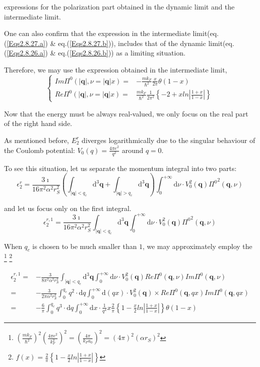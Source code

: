 expressions for the polarization part obtained in the dynamic limit and the intermediate limit.

One can also confirm that the expression in the intermediate limit(eq.(\ref{Eqs2.8.27.a}) \& eq.(\ref{Eqs2.8.27.b})), includes that of the dynamic limit(eq.(\ref{Eqs2.8.26.a}) \& eq.(\ref{Eqs2.8.26.b})) as a limiting situation.

Therefore, we may use the expression obtained in the intermediate limit,
\[\left\{ \begin{split}
Im \Pi^0(|\mathbf{q}|, \nu = |\mathbf{q}| x) =& - \frac{m k_F}{\hbar^2} \frac{x}{2\pi} \theta(1-x)\\
Re \Pi^0(|\mathbf{q}|, \nu = |\mathbf{q}| x) =& \frac{m k_F}{\hbar^2}\frac{1}{2\pi^2}\left\{ -2 + x ln\left| \frac{1+x}{1-x} \right| \right\}
\end{split} \right.\]

Now that the energy must be always real-valued, we only focus on the real part of the right hand side.

As mentioned before, $E_2^r$ diverges logarithmically due to the singular behaviour of the Coulomb potential: $V_0(q) = \frac{4\pi e^2}{q^2}$ around $q=0$.

To see this situation, let us separate the momentum integral into two parts:
\[ \epsilon_2^r = \frac{3\imath}{16\pi^2 \alpha^2 r_S^2} \left( \int_{|\mathbf{q}|<q_c} \mathrm{d}^3 \mathbf{q} + \int_{|\mathbf{q}|>q_c} \mathrm{d}^3 \mathbf{q} \right) \int_0^{+\infty} \mathrm{d} \nu \cdot V_0^2(\mathbf{q}) {\Pi^0}^2(\mathbf{q},\nu) \]

and let us focus only on the first integral.
\begin{equation*} \label{Eqs2.8.9.c} \tag{2.8.9.c}
\epsilon_2^{r,1} = \frac{3\imath}{16\pi^2 \alpha^2 r_S^2} \int_{|\mathbf{q}|<q_c} \mathrm{d}^3 \mathbf{q} \int_0^{+\infty} \mathrm{d} \nu \cdot V_0^2(\mathbf{q}) {\Pi^0}^2(\mathbf{q},\nu)
\end{equation*}

When $q_c$ is chosen to be much smaller than $1$, we may approximately employ the
\footnote{$\left(\frac{m k_F}{\hbar^2}\right)^2\left( \frac{4\pi e^2}{k_F^2} \right)^2 = \left( \frac{4\pi}{k_F a_0} \right)^2 = (4\pi)^2(\alpha r_S)^2$}
\footnote{$f(x)=\frac{2}{\pi} \left\{ 1 - \frac{x}{2} ln\left| \frac{1+x}{1-x} \right| \right\}$}

\[\begin{split}
\epsilon_2^{r,1} =& -\frac{3}{8\pi^2 \alpha^2 r_S^2} \int_{|\mathbf{q}|<q_c} \mathrm{d}^3 \mathbf{q} \int_0^{+\infty} \mathrm{d} \nu \cdot V_0^2(\mathbf{q}) Re\Pi^0(\mathbf{q},\nu) Im\Pi^0(\mathbf{q},\nu)\\
=&-\frac{3}{2\pi \alpha^2 r_S^2} \int_0^{q_c} q^2 \cdot \mathrm{d} q \int_0^{+\infty} \mathrm{d} (q x) \cdot V_0^2(\mathbf{q}) \times Re\Pi^0(\mathbf{q},q x) Im\Pi^0(\mathbf{q},q x)\\
=& -\frac{6}{\pi} \int_0^{q_c} q^3 \cdot \mathrm{d} q \int_0^{+\infty} \mathrm{d} x \cdot \frac{1}{q^4} x \frac{2}{\pi} \left\{ 1 - \frac{x}{2} ln\left| \frac{1+x}{1-x} \right| \right\} \theta(1-x)
\end{split}\]

